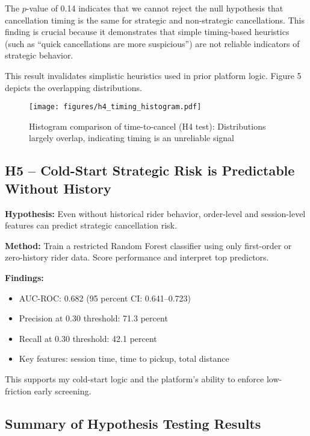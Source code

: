 The $p$-value of 0.14 indicates that we cannot reject the null hypothesis that cancellation timing is the same for strategic and non-strategic cancellations. This finding is crucial because it demonstrates that simple timing-based heuristics (such as ``quick cancellations are more suspicious'') are not reliable indicators of strategic behavior.

This result invalidates simplistic heuristics used in prior platform logic. Figure 5 depicts the overlapping distributions.

\begin{figure}[H]
\centering
\texttt{[image: figures/h4\_timing\_histogram.pdf]}
\caption{Histogram comparison of time-to-cancel (H4 test): Distributions largely overlap, indicating timing is an unreliable signal}
\label{fig:h4_timing}
\end{figure}

\subsection{H5 -- Cold-Start Strategic Risk is Predictable Without History}

\textbf{Hypothesis:} Even without historical rider behavior, order-level and session-level features can predict strategic cancellation risk.

\textbf{Method:} Train a restricted Random Forest classifier using only first-order or zero-history rider data. Score performance and interpret top predictors.

\textbf{Findings:}
\begin{itemize}
    \item AUC-ROC: 0.682 (95 percent CI: 0.641--0.723)
    \item Precision at 0.30 threshold: 71.3 percent
    \item Recall at 0.30 threshold: 42.1 percent
    \item Key features: session time, time to pickup, total distance
\end{itemize}

This supports my cold-start logic and the platform's ability to enforce low-friction early screening.

\subsection{Summary of Hypothesis Testing Results}

